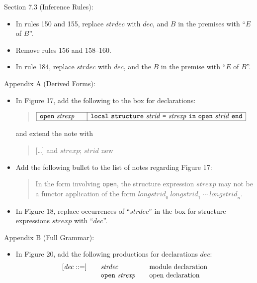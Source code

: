 \documentclass[twoside,titlepage]{article}
\begin{document}
\begin{appendix}
Section 7.3 (Inference Rules):
\begin{itemize}
\item In rules 150 and 155, replace $\mathit{strdec}$ with $\mathit{dec}$, and $B$ in the premises with ``$E$ of $B$''.

\item Remove rules 156 and 158--160.

\item In rule 184, replace $\mathit{strdec}$ with $\mathit{dec}$, and the $B$ in the premise with ``$E$ of $B$''.
\end{itemize}

Appendix A (Derived Forms):
\begin{itemize}
\item In Figure 17, add the following to the box for declarations:
  \begin{quote}
  $\begin{array}{|l|l|}
  \hline
  {\tt{open}}~\mathit{strexp}~~~~
  & {\tt{local}}~{\tt{structure}}~\mathit{strid}~\mbox{\tt=}~\mathit{strexp}~{\tt{in}}~{\tt{open}}~\mathit{strid}~{\tt{end}} \\
  \hline
  \end{array}$
  \end{quote}
  and extend the note with
  \begin{quote}
  [\dots] and $\mathit{strexp}$; $\mathit{strid}$ new
  \end{quote}

\item Add the following bullet to the list of notes regarding Figure 17:
  \begin{quote}
  In the form involving {\tt open}, the structure expression $\mathit{strexp}$ may not be a functor application of the form $\mathit{longstrid}_0~\mathit{longstrid}_1~\cdots~\mathit{longstrid}_n$.
  \end{quote}

\item In Figure 18, replace occurrences of  ``$\mathit{strdec}$'' in the box for structure expressions $\mathit{strexp}$ with ``$\mathit{dec}$''.
\end{itemize}

Appendix B (Full Grammar):
\begin{itemize}
\item In Figure 20, add the following productions for declarations $\mathit{dec}$:
  $$
  \begin{array}{l@{\qquad}l@{\qquad}l}
  [\mathit{dec} ::=] & \mathit{strdec} & \textrm{module declaration} \\
  & {\tt{open}}~\mathit{strexp} & \textrm{open declaration} \\
  \end{array}
  $$


\end{itemize}
\end{appendix}
\end{document}
